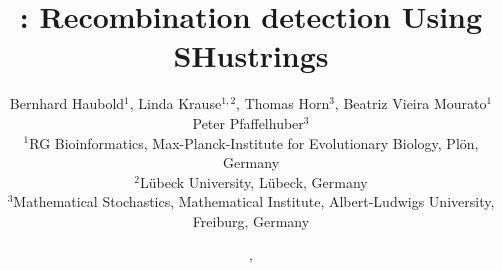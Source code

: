 \documentclass{article}
\begin{document}
\pagestyle{noweb}

\title{: Recombination detection Using SHustrings}
\author{Bernhard Haubold$^1$, Linda Krause$^{1,2}$, Thomas Horn$^3$,
  Beatriz Vieira Mourato$^1$\\
  Peter Pfaffelhuber$^3$\\
\small $^1$RG Bioinformatics, Max-Planck-Institute for Evolutionary Biology, Pl\"on,
Germany\\
\small $^2$L\"ubeck University, L\"ubeck, Germany\\
\small $^3$Mathematical Stochastics, Mathematical Institute,
Albert-Ludwigs University, Freiburg, Germany}
\date{\!\!, }
\maketitle




\end{document}
